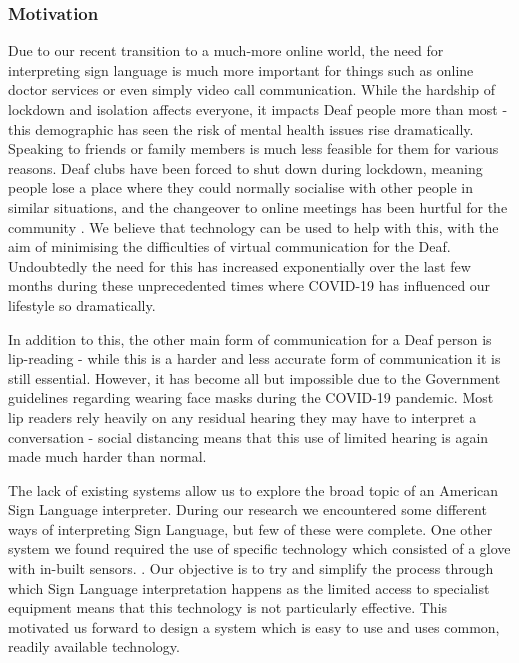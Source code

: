 \documentclass[10pt]{article}
\begin{document}
\subsubsection{Motivation}

Due to our recent transition to a much-more online world, the need for interpreting sign 
language is much more important for things such as online doctor services or even simply video call 
communication. 
While the hardship of lockdown and isolation affects everyone, it impacts Deaf people 
more than most - this demographic has seen the risk of mental health issues rise dramatically. 
Speaking to friends or family members is much less feasible for them for various reasons. 
Deaf clubs have been forced to shut down during lockdown, meaning people lose a place where they could normally 
socialise with other people in similar situations, and the changeover to online meetings has been 
hurtful for the community \cite{heren_2020}.
We believe that technology can be used to help with this, with the aim of minimising the difficulties of virtual communication for the Deaf.
Undoubtedly the need for this has increased exponentially over the last few months \cite{kalia_2020} 
during these unprecedented times where COVID-19 has influenced our lifestyle so dramatically.

In addition to this, the other main form of communication for a Deaf person is lip-reading 
\cite{hearing_dogs_for_deaf_people} - while this is a harder and less accurate form of communication 
it is still essential. However, it has become all but impossible due to the Government guidelines 
regarding wearing face masks during the COVID-19 pandemic. Most lip readers rely heavily on any 
residual hearing they may have to interpret a conversation - social distancing means that this use 
of limited hearing is again made
much harder than normal. 

The lack of existing systems allow us to explore the broad topic of an American Sign 
Language interpreter. During our research we encountered some different ways of interpreting Sign 
Language, but few of these were complete. One other system we found required the use of specific 
technology which consisted of a glove with in-built sensors. \cite{mehdi_khan_2002}. Our objective 
is to try and simplify the process through which Sign Language interpretation happens as the limited 
access to specialist equipment means that this technology is not particularly effective. This 
motivated us forward to design a system which is easy to use and uses common, readily available 
technology. 
\end{document}
